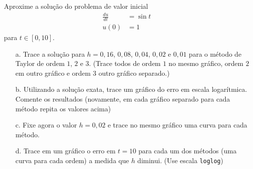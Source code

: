 \begin{ex}
Aproxime a solução do problema de valor inicial
\begin{eqnarray}
   \frac{du}{dt} &=\sin{t}\\
            u(0) &= 1
\end{eqnarray}
para  $t\in [0,10]$.

\begin{enumerate}
\item [a.] Trace a solução para $h=0,16$, $0,08$, $0,04$, $0,02$ e $0,01$ para o método de Taylor de ordem $1$, $2$ e $3$. (Trace todos de ordem $1$ no mesmo gráfico, ordem $2$ em outro gráfico e ordem $3$ outro gráfico separado.)

\item [b.] Utilizando a solução exata, trace um gráfico do erro em escala logar\'itmica.
Comente os resultados (novamente, em cada gráfico separado para cada método repita os valores acima)

\item [c.] Fixe agora o valor $h=0,02$ e trace no mesmo gráfico uma curva para cada método.

\item [d.] Trace em um gráfico o erro em $t=10$ para cada um dos métodos (uma curva para cada ordem) a medida que $h$ diminui. (Use escala \verb#loglog#)
\end{enumerate}
\end{ex}











